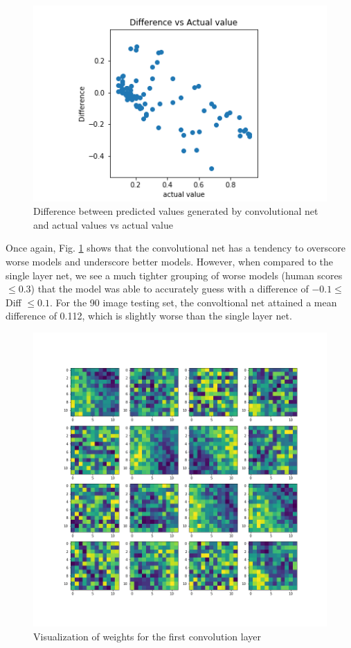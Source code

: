 \documentclass[conference]{IEEEtran}
\begin{document}
\begin{figure}[htbp]
\centerline{\includegraphics[width=0.75\linewidth]{./Images/ConvDiffVAct.png}}
\caption{Difference between predicted values generated by convolutional net and actual values vs actual value}
\label{fig:ConvDiffVAct}
\end{figure}

Once again, Fig. \ref{fig:ConvDiffVAct} shows that the convolutional net has a tendency to overscore worse models and underscore better models. However, when compared to the single layer net, we see a much tighter grouping of worse models (human scores $\leq0.3$) that the model was able to accurately guess with a difference of $-0.1 \leq$ Diff $\leq 0.1$. For the 90 image testing set, the convoltional net attained a mean difference of 0.112, which is slightly worse than the single layer net. 

\begin{figure}[htbp]
\centerline{\includegraphics[width=0.75\linewidth]{./Images/convWeight1.png}}
\caption{Visualization of weights for the first convolution layer}
\label{fig:convWeight1}
\end{figure}
\end{document}
